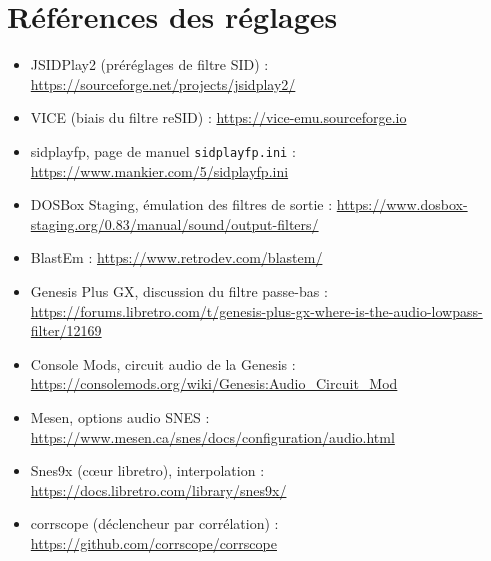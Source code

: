 \section*{Références des réglages}
\begin{itemize}
  \item JSIDPlay2 (préréglages de filtre SID) : \url{https://sourceforge.net/projects/jsidplay2/}
  \item VICE (biais du filtre reSID) : \url{https://vice-emu.sourceforge.io}
  \item sidplayfp, page de manuel \texttt{sidplayfp.ini} : \url{https://www.mankier.com/5/sidplayfp.ini}
  \item DOSBox Staging, émulation des filtres de sortie : \url{https://www.dosbox-staging.org/0.83/manual/sound/output-filters/}
  \item BlastEm : \url{https://www.retrodev.com/blastem/}
  \item Genesis Plus GX, discussion du filtre passe-bas : \url{https://forums.libretro.com/t/genesis-plus-gx-where-is-the-audio-lowpass-filter/12169}
  \item Console Mods, circuit audio de la Genesis : \url{https://consolemods.org/wiki/Genesis:Audio_Circuit_Mod}
  \item Mesen, options audio SNES : \url{https://www.mesen.ca/snes/docs/configuration/audio.html}
  \item Snes9x (cœur libretro), interpolation : \url{https://docs.libretro.com/library/snes9x/}
  \item corrscope (déclencheur par corrélation) : \url{https://github.com/corrscope/corrscope}
\end{itemize}
